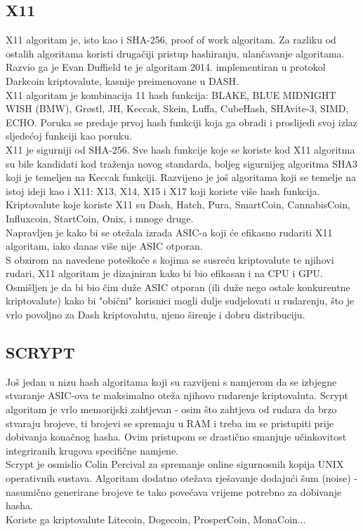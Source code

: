 \documentclass[12pt]{article}
\begin{document}
\subsection{X11}
X11 algoritam je, isto kao i SHA-256, proof of work algoritam. Za razliku od ostalih algoritama koristi drugačiji pristup hashiranju, ulančavanje algoritama. Razvio ga je Evan Duffield te je algoritam 2014. implementiran u protokol Darkcoin kriptovalute, kasnije preimenovane u DASH.\\
X11 algoritam je kombinacija 11 hash funkcija: BLAKE, BLUE MIDNIGHT WISH (BMW), Grøstl, JH, Keccak, Skein, Luffa, CubeHash, SHAvite-3, SIMD, ECHO. Poruka se predaje prvoj hash funkciji koja ga obradi i proslijedi svoj izlaz sljedećoj funkciji kao poruku.\\
X11 je sigurniji od SHA-256. Sve hash funkcije koje se koriste kod X11 algoritma su bile kandidati kod traženja novog standarda, boljeg sigurnijeg algoritma SHA3 koji je temeljen na Keccak funkciji.
Razvijeno je još algoritama koji se temelje na istoj ideji kao i X11: X13, X14, X15 i X17 koji koriste više hash funkcija.\\
Kriptovalute koje koriste X11 su Dash, Hatch, Pura, SmartCoin, CannabisCoin, Influxcoin, StartCoin, Onix, i mnoge druge.\cite{x11-description} \\
Napravljen je kako bi se otežala izrada ASIC-a koji će efikasno rudariti X11 algoritam, iako danas više nije ASIC otporan.\\
S obzirom na navedene poteškoće s kojima se susreću kriptovalute te njihovi rudari, X11 algoritam je dizajniran kako bi bio efikasan i na CPU i GPU. Osmišljen je da bi bio čim duže ASIC otporan (ili duže nego ostale konkurentne kriptovalute) kako bi "obični" korisnici mogli dulje sudjelovati u rudarenju, što je vrlo povoljno za Dash kriptovalutu, njeno širenje i dobru distribuciju. \\  



\subsection{SCRYPT}
Još jedan u nizu hash algoritama koji su razvijeni s namjerom  da se izbjegne stvaranje ASIC-ova te maksimalno oteža njihovo rudarenje kriptovaluta. Scrypt algoritam je vrlo memorijski zahtjevan - osim što zahtjeva od rudara da brzo stvaraju brojeve, ti brojevi se spremaju u RAM i treba im se pristupiti prije dobivanja konačnog hasha. Ovim pristupom se drastično smanjuje učinkovitost integriranih krugova specifične namjene.\\
Scrypt je osmislio Colin Percival za spremanje online sigurnosnih kopija UNIX operativnih sustava. Algoritam dodatno otežava rješavanje dodajući šum (noise) - nasumično generirane brojeve te tako povećava vrijeme potrebno za dobivanje hasha. \\
Koriste ga kriptovalute Litecoin, Dogecoin, ProsperCoin, MonaCoin...\\
\end{document}
